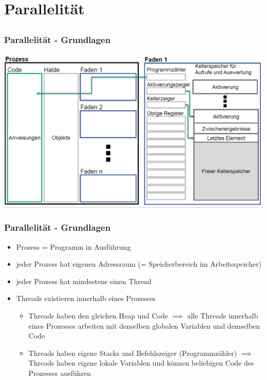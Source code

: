 \documentclass[18pt]{beamer}
\begin{document}
	
\section{Parallelität}
	\subsection{}	
	
	\begin{frame}
		\frametitle{Parallelität - Grundlagen}
		\includegraphics[scale=0.34]{./pics/tut5/proc-thr.png}
	\end{frame}

	\begin{frame}
		\frametitle{Parallelität - Grundlagen}
		\begin{itemize}
			\item Prozess = Programm in Ausführung \pause
			\item jeder Prozess hat eigenen Adressraum (= Speicherbereich im Arbeitsspeicher) \pause
			\item jeder Prozess hat mindestens einen Thread \pause
			\item Threads existieren innerhalb eines Prozesses \pause 
			\begin{itemize}
				\item Threads haben den gleichen Heap und Code \pause 
					\linebreak $\implies$ alle Threads innerhalb eines Prozesses arbeiten mit denselben globalen Variablen und demselben Code \pause 
				\item Threads haben eigene Stacks und Befehlszeiger (Programmzähler) \pause 
					\linebreak $\implies$ Threads haben eigene lokale Variablen und können beliebigen Code des Prozesses ausführen
			\end{itemize}
		\end{itemize}
	\end{frame}
	
\end{document}

